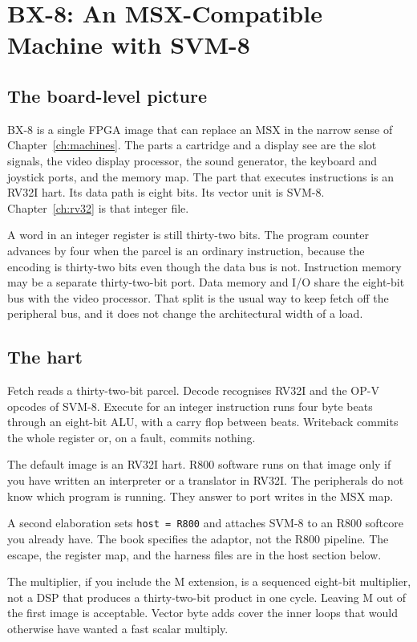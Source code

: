 \chapter{BX-8: An MSX-Compatible Machine with SVM-8}
\label{ch:bx8}

\section{The board-level picture}

BX-8 is a single FPGA image that can replace an MSX in the narrow sense of Chapter~\ref{ch:machines}. The parts a cartridge and a display see are the slot signals, the video display processor, the sound generator, the keyboard and joystick ports, and the memory map. The part that executes instructions is an RV32I hart. Its data path is eight bits. Its vector unit is SVM-8. Chapter~\ref{ch:rv32} is that integer file.

A word in an integer register is still thirty-two bits. The program counter advances by four when the parcel is an ordinary instruction, because the encoding is thirty-two bits even though the data bus is not. Instruction memory may be a separate thirty-two-bit port. Data memory and I/O share the eight-bit bus with the video processor. That split is the usual way to keep fetch off the peripheral bus, and it does not change the architectural width of a load.

\section{The hart}

Fetch reads a thirty-two-bit parcel. Decode recognises RV32I and the OP-V opcodes of SVM-8. Execute for an integer instruction runs four byte beats through an eight-bit ALU, with a carry flop between beats. Writeback commits the whole register or, on a fault, commits nothing.

The default image is an RV32I hart. R800 software runs on that image only if you have written an interpreter or a translator in RV32I. The peripherals do not know which program is running. They answer to port writes in the MSX map.

A second elaboration sets \texttt{host = R800} and attaches SVM-8 to an R800 softcore you already have. The book specifies the adaptor, not the R800 pipeline. The escape, the register map, and the harness files are in the host section below.

The multiplier, if you include the M extension, is a sequenced eight-bit multiplier, not a DSP that produces a thirty-two-bit product in one cycle. Leaving M out of the first image is acceptable. Vector byte adds cover the inner loops that would otherwise have wanted a fast scalar multiply.

